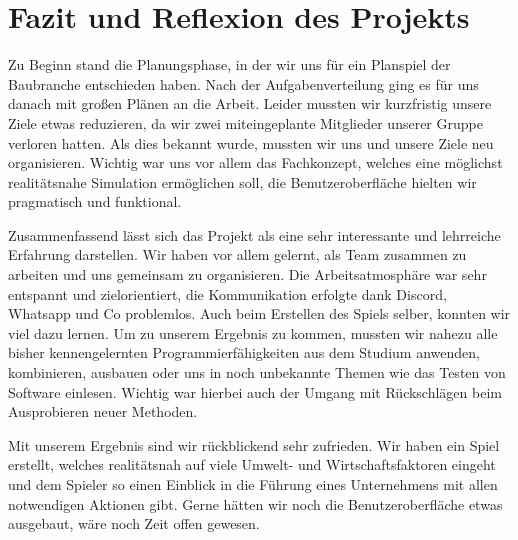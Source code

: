 \chapter{Fazit und Reflexion des Projekts}

Zu Beginn stand die Planungsphase, in der wir uns für ein Planspiel der Baubranche entschieden haben. Nach der Aufgabenverteilung ging es für uns danach mit großen Plänen an die Arbeit. Leider mussten wir kurzfristig unsere Ziele etwas reduzieren, da wir zwei miteingeplante Mitglieder unserer Gruppe verloren hatten.
Als dies bekannt wurde, mussten wir uns und unsere Ziele neu organisieren. Wichtig war uns vor allem das Fachkonzept, welches eine möglichst realitätsnahe Simulation ermöglichen soll, die Benutzeroberfläche hielten wir pragmatisch und funktional.

Zusammenfassend lässt sich das Projekt als eine sehr interessante und lehrreiche Erfahrung darstellen. Wir haben vor allem gelernt, als Team zusammen zu arbeiten und uns gemeinsam zu organisieren. Die Arbeitsatmosphäre war sehr entspannt und zielorientiert, die Kommunikation erfolgte dank Discord, Whatsapp und Co problemlos.
Auch beim Erstellen des Spiels selber, konnten wir viel dazu lernen. Um zu unserem Ergebnis zu kommen, mussten wir nahezu alle bisher kennengelernten Programmierfähigkeiten aus dem Studium anwenden, kombinieren, ausbauen oder uns in noch unbekannte Themen wie das Testen von Software einlesen. Wichtig war hierbei auch der Umgang mit Rückschlägen beim Ausprobieren neuer Methoden. 

Mit unserem Ergebnis sind wir rückblickend sehr zufrieden. Wir haben ein Spiel erstellt, welches realitätsnah auf viele Umwelt- und Wirtschaftsfaktoren eingeht und dem Spieler so einen Einblick in die Führung eines Unternehmens mit allen notwendigen Aktionen gibt.
Gerne hätten wir noch die Benutzeroberfläche etwas ausgebaut, wäre noch Zeit offen gewesen.








